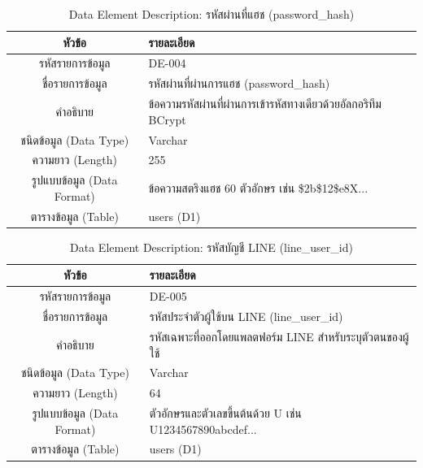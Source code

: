 \begin{table}[htbp]
\centering
\caption{Data Element Description: รหัสผ่านที่แฮช (password\_hash)}
\label{tab3:de_pwd}
\begin{tabularx}{\textwidth}{| c | L |}
\hline
\textbf{หัวข้อ} & \textbf{รายละเอียด} \\ \hline
รหัสรายการข้อมูล & DE-004 \\ \hline
ชื่อรายการข้อมูล & รหัสผ่านที่ผ่านการแฮช (password\_hash) \\ \hline
คำอธิบาย & ข้อความรหัสผ่านที่ผ่านการเข้ารหัสทางเดียวด้วยอัลกอริทึม BCrypt \\ \hline
ชนิดข้อมูล (Data Type) & Varchar \\ \hline
ความยาว (Length) & 255 \\ \hline
รูปแบบข้อมูล (Data Format) & ข้อความสตริงแฮช 60 ตัวอักษร เช่น \$2b\$12\$e8X... \\ \hline
ตารางข้อมูล (Table) & users (D1) \\ \hline
\end{tabularx}
\end{table}

\begin{table}[htbp]
\centering
\caption{Data Element Description: รหัสบัญชี LINE (line\_user\_id)}
\label{tab3:de_line_id}
\begin{tabularx}{\textwidth}{| c | L |}
\hline
\textbf{หัวข้อ} & \textbf{รายละเอียด} \\ \hline
รหัสรายการข้อมูล & DE-005 \\ \hline
ชื่อรายการข้อมูล & รหัสประจำตัวผู้ใช้บน LINE (line\_user\_id) \\ \hline
คำอธิบาย & รหัสเฉพาะที่ออกโดยแพลตฟอร์ม LINE สำหรับระบุตัวตนของผู้ใช้ \\ \hline
ชนิดข้อมูล (Data Type) & Varchar \\ \hline
ความยาว (Length) & 64 \\ \hline
รูปแบบข้อมูล (Data Format) & ตัวอักษรและตัวเลขขึ้นต้นด้วย U เช่น U1234567890abcdef... \\ \hline
ตารางข้อมูล (Table) & users (D1) \\ \hline
\end{tabularx}
\end{table}

